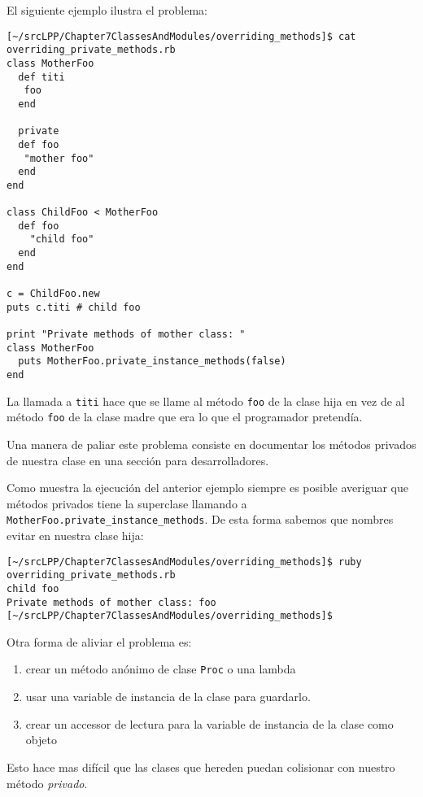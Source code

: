 El siguiente ejemplo ilustra el problema:
\begin{verbatim}
[~/srcLPP/Chapter7ClassesAndModules/overriding_methods]$ cat overriding_private_methods.rb 
class MotherFoo
  def titi 
   foo
  end

  private
  def foo
   "mother foo"
  end
end

class ChildFoo < MotherFoo
  def foo 
    "child foo"
  end
end

c = ChildFoo.new
puts c.titi # child foo

print "Private methods of mother class: "
class MotherFoo
  puts MotherFoo.private_instance_methods(false)
end
\end{verbatim}

La llamada a \verb|titi| hace que se llame al método \verb|foo| de la clase hija en vez
de al método \verb|foo| de la clase madre que era lo que el programador pretendía.

Una manera de paliar este problema consiste en documentar los métodos privados de nuestra clase
en una sección para desarrolladores. 

Como muestra la ejecución del anterior ejemplo 
siempre es posible averiguar que métodos privados tiene la superclase llamando a 
\verb|MotherFoo.private_instance_methods|. De esta forma sabemos que nombres 
evitar en nuestra clase hija:

\begin{verbatim}
[~/srcLPP/Chapter7ClassesAndModules/overriding_methods]$ ruby overriding_private_methods.rb 
child foo
Private methods of mother class: foo
[~/srcLPP/Chapter7ClassesAndModules/overriding_methods]$ 
\end{verbatim}

Otra forma de aliviar el problema es: 
\begin{enumerate}
\item crear un método anónimo de clase \verb|Proc| o una lambda
\item usar una variable de instancia de la clase para guardarlo. 
\item crear un accessor de lectura para la variable de instancia de la clase como objeto
\end{enumerate}
Esto hace mas difícil que las clases que hereden
puedan colisionar con nuestro método {\it privado}.

